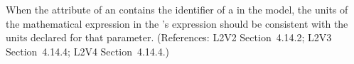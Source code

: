 When the  attribute of an \EventAssignment
contains the identifier of a \Parameter in the model, the
units of the mathematical expression in the
\EventAssignment's  expression should be
consistent with the units declared for that parameter.
(References: L2V2 Section~4.14.2; L2V3 Section~4.14.4; L2V4 Section~4.14.4.)
